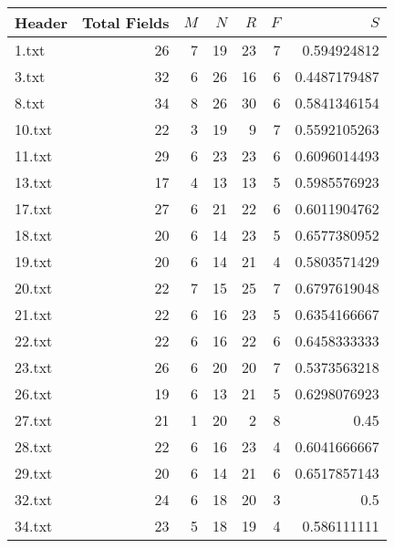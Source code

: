 \begin{table}
\centering
\begin{tabular}{@{}lrrrrrr@{}}
\toprule
Header & Total Fields &                  $M$  & $N$  & $R$ & $F$ & $S$ \\ \midrule
1.txt  & 26           & 7                     & 19   & 23  & 7   & 0.594924812    \\
3.txt  & 32           & 6                     & 26   & 16  & 6   & 0.4487179487   \\
8.txt  & 34           & 8                     & 26   & 30  & 6   & 0.5841346154   \\
10.txt & 22           & 3                     & 19   & 9   & 7   & 0.5592105263   \\
11.txt & 29           & 6                     & 23   & 23  & 6   & 0.6096014493   \\
13.txt & 17           & 4                     & 13   & 13  & 5   & 0.5985576923   \\
17.txt & 27           & 6                     & 21   & 22  & 6   & 0.6011904762   \\
18.txt & 20           & 6                     & 14   & 23  & 5   & 0.6577380952   \\
19.txt & 20           & 6                     & 14   & 21  & 4   & 0.5803571429   \\
20.txt & 22           & 7                     & 15   & 25  & 7   & 0.6797619048   \\
21.txt & 22           & 6                     & 16   & 23  & 5   & 0.6354166667   \\
22.txt & 22           & 6                     & 16   & 22  & 6   & 0.6458333333   \\
23.txt & 26           & 6                     & 20   & 20  & 7   & 0.5373563218   \\
26.txt & 19           & 6                     & 13   & 21  & 5   & 0.6298076923   \\
27.txt & 21           & 1                     & 20   & 2   & 8   & 0.45           \\
28.txt & 22           & 6                     & 16   & 23  & 4   & 0.6041666667   \\
29.txt & 20           & 6                     & 14   & 21  & 6   & 0.6517857143   \\
32.txt & 24           & 6                     & 18   & 20  & 3   & 0.5            \\
34.txt & 23           & 5                     & 18   & 19  & 4   & 0.586111111    \\

\end{tabular}
\end{table}
